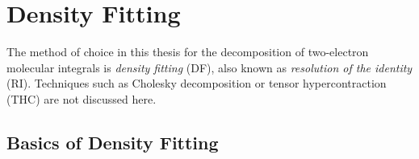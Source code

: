 



\FloatBarrier

\section{Density Fitting}

The method of choice in this thesis for the decomposition of two-electron molecular integrals is \emph{density fitting} (DF), also known as \emph{resolution of the identity} (RI). Techniques such as Cholesky decomposition \cite{Koc2003,Roe2008} or tensor hypercontraction (THC) \cite{Hoh2012,Par2012,Hoh2012a} are not discussed here. 

\subsection{Basics of Density Fitting}

